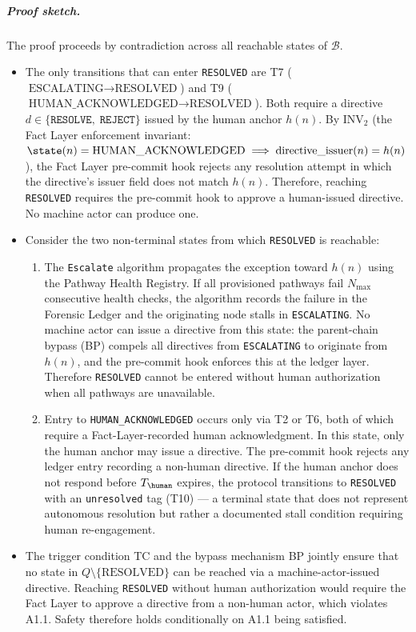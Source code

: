 \subparagraph{Proof sketch.} The proof proceeds by contradiction across all reachable states of $\mathcal{B}$.

\begin{itemize}
\item[\textbf{Step 1.}] The only transitions that can enter \texttt{RESOLVED} are T7 ($\text{ESCALATING} \rightarrow \text{RESOLVED}$) and T9 ($\text{HUMAN\_ACKNOWLEDGED} \rightarrow \text{RESOLVED}$). Both require a directive $d \in \{\texttt{RESOLVE},\; \texttt{REJECT}\}$ issued by the human anchor $h(n)$. By INV$_2$ (the Fact Layer enforcement invariant: $\state(n) = \text{HUMAN\_ACKNOWLEDGED} \implies \text{directive\_issuer}(n) = h(n)$), the Fact Layer pre-commit hook rejects any resolution attempt in which the directive's issuer field does not match $h(n)$. Therefore, reaching \texttt{RESOLVED} requires the pre-commit hook to approve a human-issued directive. No machine actor can produce one.

\item[\textbf{Step 2.}] Consider the two non-terminal states from which \texttt{RESOLVED} is reachable:

\begin{enumerate}
\item[\textbf{ESCALATING}:] The \texttt{Escalate} algorithm propagates the exception toward $h(n)$ using the Pathway Health Registry. If all provisioned pathways fail $N_{\max}$ consecutive health checks, the algorithm records the failure in the Forensic Ledger and the originating node stalls in \texttt{ESCALATING}. No machine actor can issue a directive from this state: the parent-chain bypass (BP) compels all directives from \texttt{ESCALATING} to originate from $h(n)$, and the pre-commit hook enforces this at the ledger layer. Therefore \texttt{RESOLVED} cannot be entered without human authorization when all pathways are unavailable.

\item[\textbf{HUMAN\_ACKNOWLEDGED}:] Entry to \texttt{HUMAN\_ACKNOWLEDGED} occurs only via T2 or T6, both of which require a Fact-Layer-recorded human acknowledgment. In this state, only the human anchor may issue a directive. The pre-commit hook rejects any ledger entry recording a non-human directive. If the human anchor does not respond before $T_{\human}$ expires, the protocol transitions to \texttt{RESOLVED} with an \texttt{unresolved} tag (T10) --- a terminal state that does not represent autonomous resolution but rather a documented stall condition requiring human re-engagement.
\end{enumerate}

\item[\textbf{Step 3.}] The trigger condition TC and the bypass mechanism BP jointly ensure that no state in $Q \setminus \{\text{RESOLVED}\}$ can be reached via a machine-actor-issued directive. Reaching \texttt{RESOLVED} without human authorization would require the Fact Layer to approve a directive from a non-human actor, which violates A1.1. Safety therefore holds conditionally on A1.1 being satisfied.
\end{itemize}

